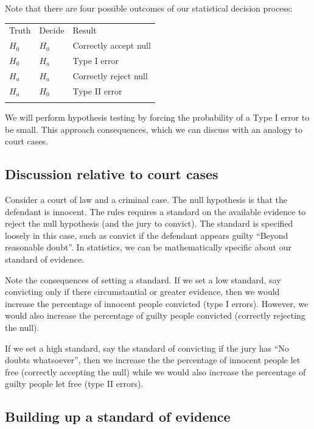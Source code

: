 \documentclass[]{article}
\begin{document}
Note that there are four possible outcomes of our statistical decision
process:

\begin{longtable}[c]{@{}lll@{}}
\toprule\addlinespace
Truth & Decide & Result
\\\addlinespace
\midrule\endhead
$H_0$ & $H_0$ & Correctly accept null
\\\addlinespace
$H_0$ & $H_a$ & Type I error
\\\addlinespace
$H_a$ & $H_a$ & Correctly reject null
\\\addlinespace
$H_a$ & $H_0$ & Type II error
\\\addlinespace
\bottomrule
\end{longtable}

We will perform hypothesis testing by forcing the probability of a Type
I error to be small. This approach consequences, which we can discuss
with an analogy to court cases.

\subsection{Discussion relative to court
cases}\label{discussion-relative-to-court-cases}

Consider a court of law and a criminal case. The null hypothesis is that
the defendant is innocent. The rules requires a standard on the
available evidence to reject the null hypothesis (and the jury to
convict). The standard is specified loosely in this case, such as
convict if the defendant appears guilty ``Beyond reasonable doubt''. In
statistics, we can be mathematically specific about our standard of
evidence.

Note the consequences of setting a standard. If we set a low standard,
say convicting only if there circumstantial or greater evidence, then we
would increase the percentage of innocent people convicted (type I
errors). However, we would also increase the percentage of guilty people
convicted (correctly rejecting the null).

If we set a high standard, say the standard of convicting if the jury
has ``No doubts whatsoever'', then we increase the the percentage of
innocent people let free (correctly accepting the null) while we would
also increase the percentage of guilty people let free (type II errors).

\subsection{Building up a standard of
evidence}\label{building-up-a-standard-of-evidence}
\end{document}
